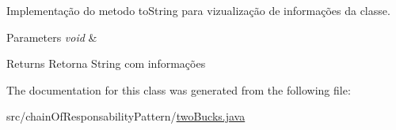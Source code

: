 Implementação do metodo to\+String para vizualização de informações da classe. 


\begin{DoxyParams}{Parameters}
{\em void} & \\
\hline
\end{DoxyParams}
\begin{DoxyReturn}{Returns}
Retorna String com informações 
\end{DoxyReturn}


The documentation for this class was generated from the following file\+:\begin{DoxyCompactItemize}
\item 
src/chain\+Of\+Responsability\+Pattern/\mbox{\hyperlink{two_bucks_8java}{two\+Bucks.\+java}}\end{DoxyCompactItemize}
